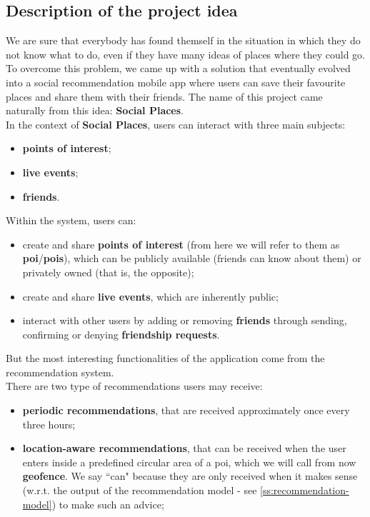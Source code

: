 \documentclass[../../main]{subfiles}
\begin{document}
\label{ss:description-project-idea}
\subsection{Description of the project idea}
We are sure that everybody has found themself in the situation in which they do not know what to do, even if they have many ideas of places where they could go.
To overcome this problem, we came up with a solution that eventually evolved into a social recommendation mobile app where users can save their favourite places and share them with their friends.
The name of this project came naturally from this idea: \textbf{Social Places}.\\
In the context of \textbf{Social Places}, users can interact with three main subjects:
\begin{itemize}
    \item \textbf{points of interest};
    \item \textbf{live events};
    \item \textbf{friends}.
\end{itemize}
Within the system, users can:
\begin{itemize}
    \item create and share \textbf{points of interest} (from here we will refer to them as \textbf{poi}/\textbf{pois}), which can be publicly available (friends can know about them) or privately owned (that is, the opposite);
    \item create and share \textbf{live events}, which are inherently public;
    \item interact with other users by adding or removing \textbf{friends} through sending, confirming or denying \textbf{friendship requests}.
\end{itemize}
But the most interesting functionalities of the application come from the recommendation system.\\
There are two type of recommendations users may receive:
\begin{itemize}
    \item \textbf{periodic recommendations}, that are received approximately once every three hours;
    \item \textbf{location-aware recommendations}, that can be received when the user enters inside a predefined circular area of a poi, which we will call from now \textbf{geofence}.
    We say ``can" because they are only received when it makes sense (w.r.t. the output of the recommendation model - see \ref{ss:recommendation-model}) to make such an advice;
\end{itemize}
\end{document}

